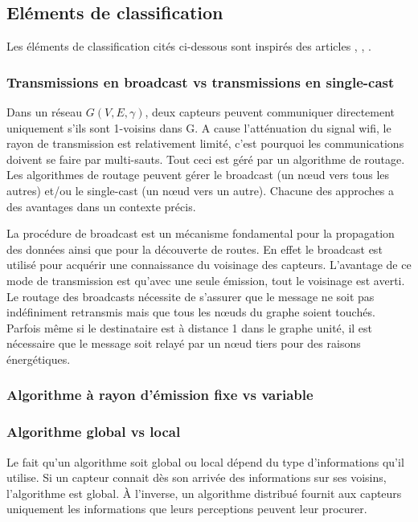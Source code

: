 \subsection{Eléments de classification}
Les éléments de classification cités ci-dessous sont inspirés des articles \cite{stojmenovic2004}, \cite{ingelrest2005}, \cite{wu2003}.



\subsubsection{Transmissions en broadcast vs transmissions en single-cast}
Dans un réseau $G(V,E,\gamma)$, deux capteurs peuvent communiquer directement uniquement s'ils sont 1-voisins dans G. A cause l'atténuation du signal wifi, le rayon de transmission est relativement limité, c'est pourquoi les communications doivent se faire par multi-sauts. Tout ceci est géré par un algorithme de routage. Les algorithmes de routage peuvent gérer le broadcast (un nœud vers tous les autres) et/ou le single-cast (un nœud vers un autre). Chacune des approches a des avantages dans un contexte précis.

La procédure de broadcast est un mécanisme fondamental pour la propagation des données ainsi que pour la découverte de routes. En effet le broadcast est utilisé pour acquérir une connaissance du voisinage des capteurs. L'avantage de ce mode de transmission est qu'avec une seule émission, tout le voisinage est averti. Le routage des broadcasts nécessite de s'assurer que le message ne soit pas indéfiniment retransmis mais que tous les nœuds du graphe soient touchés. Parfois même si le destinataire est à distance 1 dans le graphe unité, il est nécessaire que le message soit relayé par un nœud tiers pour des raisons énergétiques.


\subsubsection{Algorithme à rayon d'émission fixe vs variable}


\subsubsection{Algorithme global vs local}
Le fait qu'un algorithme soit global ou local dépend du type d'informations qu'il utilise. Si un capteur connait dès son arrivée des informations sur ses voisins, l'algorithme est global. À l'inverse, un algorithme distribué fournit aux capteurs uniquement les informations que leurs perceptions peuvent leur procurer.

